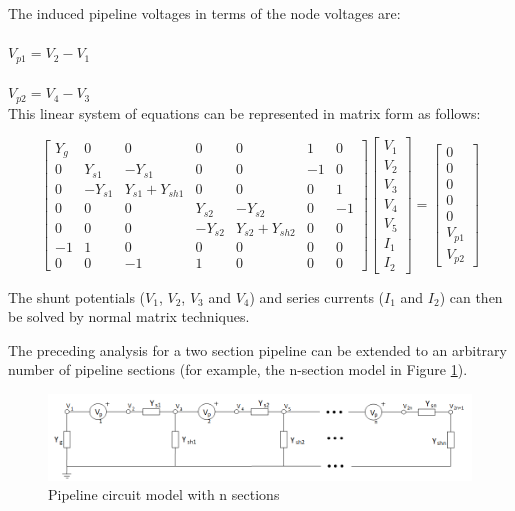 \documentclass{article}
\begin{document}
The induced pipeline voltages in terms of the node voltages are:
\\ \\
\hphantom{whe}$V_{p1} = V_2 - V_1 $ \\ \\
\hphantom{whe}$V_{p2} = V_4 - V_3 $ \\

This linear system of equations can be represented in matrix form as follows:

\begin{equation}
\begin{bmatrix}
Y_g & 0 & 0 & 0 & 0 & 1 & 0 \\
0 & Y_{s1} & -Y_{s1} & 0 & 0 & -1 & 0 \\
0 & -Y_{s1} & Y_{s1} + Y_{sh1} & 0 & 0 & 0 & 1 \\
0 & 0 & 0 & Y_{s2} & -Y_{s2} & 0 & -1 \\
0 & 0 & 0 & -Y_{s2} & Y_{s2} + Y_{sh2} & 0 & 0 \\
-1 & 1 & 0 & 0 & 0 & 0 & 0 \\
0 & 0 & -1 & 1 & 0 & 0 & 0
\end{bmatrix}
\begin{bmatrix}
V_{1} \\ V_{2} \\ V_{3} \\ V_{4} \\ V_{5} \\ I_{1} \\ I_{2}
\end{bmatrix}
=
\begin{bmatrix}
0 \\ 0 \\ 0 \\ 0 \\ 0 \\ V_{p1} \\ V_{p2}
\end{bmatrix}
\end{equation}

The shunt potentials ($V_1$, $V_2$, $V_3$ and $V_4$) and series currents ($I_1$ and $I_2$) can then be solved by normal matrix techniques.

The preceding analysis for a two section pipeline can be extended to an arbitrary number of pipeline sections (for example, the n-section model in Figure \ref{fig:pipeline_model}).

\begin{figure}[!htp]
\begin{center}
\caption{Pipeline circuit model with n sections}
\label{fig:pipeline_model}
\includegraphics[width=\linewidth]{./Figures/pipeline_model.png}
\end{center}
\end{figure}
\end{document}
